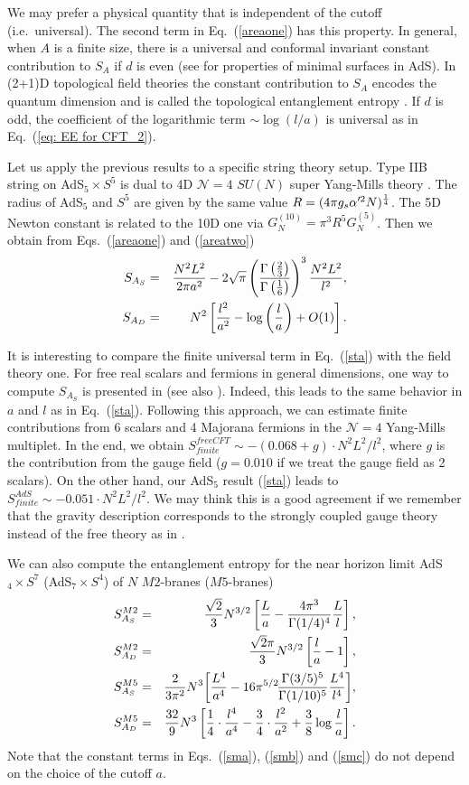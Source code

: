 \documentclass[amsmath,amssymb,nofootinbib,eqsecnum,tighten,prd,12pt]{revtex4}
\def\frac#1#2{{#1\over #2}}
\def\s{\sqrt}
\def\al{\alpha'}
\def\f {\frac}
\def\frac#1#2{{#1\over #2}}
\def\s{\sqrt}
\def\ba{\begin{eqnarray}}
\def\ea{\end{eqnarray}}
\begin{document}
We may prefer a physical quantity that is independent of the cutoff
(i.e.~universal). The second term in Eq.\ (\ref{areaone}) has this
property. In general, when $A$ is a finite size, there is a
universal and conformal invariant constant contribution to $S_A$ if
$d$ is even (see \cite{GrWi} for properties of minimal surfaces in
AdS). In (2+1)D topological field theories the constant contribution
to $S_A$ encodes the quantum dimension and is called the topological
entanglement entropy \cite{Kitaev05, Levin05}.  If $d$ is odd, the
coefficient of the logarithmic term $\sim \log(l/a)$ is universal as
in Eq.\ (\ref{eq: EE for CFT_2}).



Let us apply the previous results to a specific string theory setup.
Type IIB string on AdS$_5\times S^5$ is dual to 4D $\mathcal{N}=4$
$SU(N)$ super Yang-Mills theory \cite{Maldacena}. 
The radius of AdS$_5$ and $S^5$ are
given by the same value $R=(4\pi g_s \al^2 N)^{\f{1}{4}}$. The 5D Newton constant
is related to the 10D one via $G^{(10)}_N=\pi^3R^5 G^{(5)}_N $. Then
we obtain from Eqs.\ (\ref{areaone}) and (\ref{areatwo}) \ba
S_{A_{S}}&=&\f{N^2L^2}{2\pi a^2}-2\s{\pi}
\left(\f{\Gamma\left(\f23\right)}{\Gamma\left(\f16\right)}
\right)^3\f{N^2L^2}{l^2}, \label{sta}\\
S_{A_{D}}&=&
N^2\left[\f{l^2}{a^2}-\log\left(\f{l}{a}\right)+O(1)\right].
\ea


It is interesting to compare the finite universal term in Eq.\
(\ref{sta}) with the field theory one. For free real scalars and
 fermions in general dimensions, one way to compute $S_{A_S}$
is presented in \cite{Casini} (see also \cite{Fursaev}). Indeed, this leads to the same
behavior in $a$ and $l$ as in Eq.\ (\ref{sta}). Following this
approach, we can estimate finite contributions from 6 scalars and 4
Majorana fermions in the $\mathcal{N}=4$ Yang-Mills multiplet.  In
the end, we obtain $S^{freeCFT}_{finite}\sim -(0.068+g)\cdot
N^2L^2/l^2$, where $g$ is the contribution from the gauge field
($g=0.010$ if we treat the gauge field as 2 scalars). On the other
hand, our AdS$_5$ result (\ref{sta}) leads to $S^{AdS}_{finite}\sim
-0.051\cdot N^2L^2/l^2$. We may think this is a good agreement if we
remember that the gravity description corresponds to the strongly
coupled gauge theory
 instead of the free theory as in \cite{GKP}.


We can also compute the entanglement entropy for the near horizon limit
AdS$_{4}\times S^{7}$ (AdS$_{7}\times S^{4}$) of $N$ $M2$-branes
($M5$-branes)
\ba
S^{M2}_{A_S}&=&\f{\s{2}}{3}N^{3/2}\left[\f{L}{a}-
\f{4\pi^3}{\Gamma(1/4)^4}\f{L}{l}\right], \label{sma} \\
S^{M2}_{A_D}&=&\f{\s{2}\pi}{3}N^{3/2}\left[\f{l}{a}-1\right],  \label{smb}\\
 S^{M5}_{A_S}&=&\!\f{2}{3\pi^2}N^{3}\!\left[\f{L^4}{a^4}-
16\pi^{5/2}\!\f{\Gamma(3/5)^5}{\Gamma(1/10)^5}\f{L^4}{l^4}\right]\!,  \label{smc}\\
S^{M5}_{A_D}&=&\f{32}{9}N^{3}\left[\f{1}{4}\cdot\f{l^4}{a^4}
-\f{3}{4}\cdot\f{l^2}{a^2}+\f{3}{8}\log\f{l}{a}\right]. \ea Note
that the constant terms in Eqs.\ (\ref{sma}), (\ref{smb}) and  (\ref{smc})
do not depend on the choice of the cutoff $a$.
\end{document}

